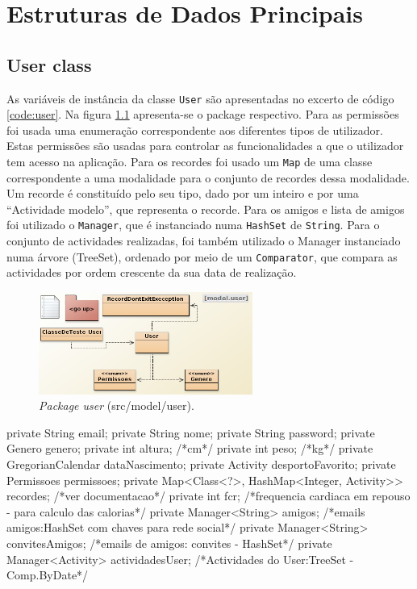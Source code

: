 \documentclass[a4paper,10pt]{report}
\begin{document}
\newpage
\phantom{placeholder} %
\thispagestyle{empty} %
\chapter{Estruturas de Dados Principais}
\label{cap:estruturas}
\section{User class}
\label{sec:user}
As variáveis de instância da classe \verb!User! são apresentadas no excerto de código \ref{code:user}.
Na figura \ref{fig:user} apresenta-se o package respectivo.
Para as permissões foi usada uma enumeração correspondente aos diferentes tipos de utilizador. 
Estas permissões são usadas para controlar as funcionalidades a que o utilizador tem acesso na aplicação.
Para os recordes foi usado um \verb!Map! de uma classe correspondente a uma modalidade para o conjunto de recordes dessa modalidade. 
Um recorde é constituído pelo seu tipo, dado por um inteiro e por uma ``Actividade modelo'', que representa o recorde.
Para os amigos e lista de amigos foi utilizado o \verb!Manager!, que é instanciado numa \verb!HashSet! de \verb!String!.
Para o conjunto de actividades realizadas, foi também utilizado o Manager instanciado numa árvore (TreeSet), ordenado por meio 
de um \verb!Comparator!, que compara as actividades por ordem crescente da sua data de realização.

\begin{figure}
\centering
\includegraphics[width=7cm]{user.png}
\caption{\emph{Package user}  (src/model/user).}
\label{fig:user}
\end{figure}

\begin{code}[caption=Variáveis de instância da classe User (src/model/user)., label=code:user]
private String email;
private String nome;
private String password;
private Genero genero;
private int altura; /*cm*/
private int peso; /*kg*/
private GregorianCalendar dataNascimento;
private Activity desportoFavorito;
private Permissoes permissoes;
private Map<Class<?>, HashMap<Integer, Activity>>  recordes; /*ver documentacao*/
private int fcr; /*frequencia cardiaca em repouso - para calculo das calorias*/
private Manager<String> amigos; /*emails amigos:HashSet com chaves para rede social*/
private Manager<String> convitesAmigos; /*emails de amigos: convites - HashSet*/
private Manager<Activity> actividadesUser; /*Actividades do User:TreeSet -Comp.ByDate*/
\end{code}
\end{document}
